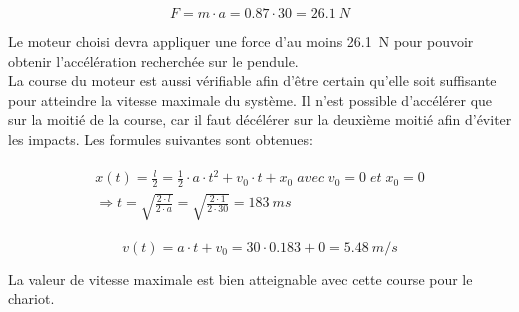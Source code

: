 \begin{equation}\label{eq:ForceMot}
    F = m \cdot a = 0.87 \cdot 30 = 26.1~N
\end{equation}

Le moteur choisi devra appliquer une force d'au moins 26.1~N pour pouvoir obtenir l'accélération recherchée sur le pendule.\\

La course du moteur est aussi vérifiable afin d'être certain qu'elle soit suffisante pour atteindre la vitesse maximale du système. Il n'est possible
d'accélérer que sur la moitié de la course, car il faut décélérer sur la deuxième moitié afin d'éviter les impacts. Les formules suivantes sont
obtenues:

\begin{align}\label{eq:TempsMouv}
    \begin{split}
        x(t) = \frac{l}{2} = \frac{1}{2} \cdot a \cdot t^2 + v_0 \cdot t + x_0 \; avec \; v_0 = 0 \; et \; x_0 = 0 \\ \Rightarrow t = \sqrt{\frac{2 \cdot l}{2 \cdot a}} = \sqrt{\frac{2 \cdot 1}{2 \cdot 30}} = 183~ms
    \end{split}
\end{align}

\begin{equation}
    v(t) = a \cdot t + v_0 = 30 \cdot 0.183 + 0 = 5.48~m/s
\end{equation}

La valeur de vitesse maximale est bien atteignable avec cette course pour le chariot.
